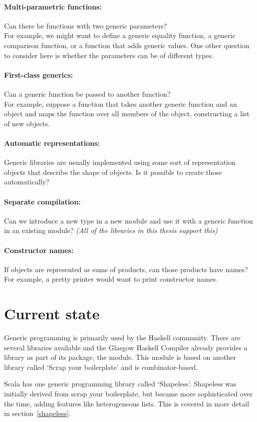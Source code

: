 \paragraph{Multi-parametric functions:} Can there be functions with two generic parameters?
\\
For example, we might want to define a generic equality function, a generic
comparison function, or a function that adds generic values. One other question
to consider here is whether the parameters can be of different types.

\paragraph{First-class generics:} Can a generic function be passed to another function?
\\
For example, suppose a function  that takes another generic function 
and an object and maps the function  over all members of the object, constructing
a list of new objects.

\paragraph{Automatic representations:} Generic libraries are usually implemented
using some sort of representation objects that describe the shape of
objects. Is it possible to create those automatically?

\paragraph{Separate compilation:} Can we introduce a new type in a new module
and use it with a generic function in an existing module?
\textit{(All of the libraries in this thesis support this)}


\paragraph{Constructor names:} If objects are represented as sums of products,
can those products have names?
For example, a pretty printer would want to print constructor names.


\section*{Current state}
Generic programming is primarily used by the Haskell community. There are
several libraries available and the Glasgow Haskell Compiler already provides
a library as part of its  package, the  module. This
module is based on another library called `Scrap your boilerplate'\cite{DBLP:conf/tldi/LammelJ03}
and is combinator-based.

Scala has one generic programming library called `Shapeless'. Shapeless was
initially derived from scrap your boilerplate, but became more sophisticated
over the time, adding features like heterogeneous lists. This is covered
in more detail in section~\ref{shapeless}.
